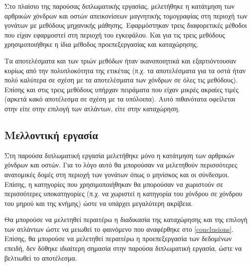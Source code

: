 \documentclass[a4paper,12pt]{article}
\begin{document}
Στο πλαίσιο της παρούσας διπλωματικής εργασίας, μελετήθηκε η κατάτμηση των
αρθρικών χόνδρων και οστών απεικονίσεων μαγνητικής τομογραφίας στη περιοχή των
γονάτων με μεθόδους μηχανικής μάθησης. Εφαρμόστηκαν τρεις διαφορετικές μέθοδοι
\cite{Zhang:1} \cite{Tong:1} \cite{Coupe:1} που είχαν εφαρμοστεί στη περιοχή του
εγκεφάλου. Και για τις τρεις μεθόδους χρησιμοποιήθηκε η ίδια μέθοδος
προεπεξεργασίας και καταχώρησης.

Τα αποτελέσματα και των τριών μεθόδων ήταν ικανοποιητικά και εξαρτιόντουσαν
κυρίως από την πολυπλοκότητα της ετικέτας (π.χ. τα αποτελέσματα για τα οστά ήταν
πολύ καλύτερα σε σχέση με τα αποτελέσματα των χόνδρων σε όλες τις μεθόδους).
Επίσης και στις τρεις μεθόδους υπήρχαν πειράματα που είχαν μικρές ακραίες τιμές
(αρκετά κακό αποτέλεσμα σε σχέση με τα υπόλοιπα). Αυτό πιθανότατα οφείλεται στην
είτε στην επιλογή των ατλάντων, είτε στην καταχώρηση.

\subsection{Μελλοντική εργασία}

Στη παρούσα διπλωματική εργασία μελετήθηκε μόνο η κατάτμηση των αρθρικών χόνδρων
και οστών. Για το λόγο αυτό θα μπορούσαν να μελετηθούν περισσότερες ανατομικές
δομές στη περιοχή των γονάτων όπως ο μηνίσκος και οι σύνδεσμοι. Επίσης, η
κατηγορίες που χρησιμοποιήθηκαν θα μπορούσαν να χωριστούν σε περισσότερες
υποκατηγορίες (π.χ. να χωριστεί η κατηγορία του χόνδρου σε χόνδρου του μηρού και
της κνήμης) ώστε να υπάρχει μεγαλύτερη ακρίβεια.

Θα μπορούσε να μελετηθεί περαιτέρω η διαδικασία της καταχώρησης και της επιλογή
των ατλάντων ώστε να μειωθεί το φαινόμενο που αναφέρθηκε στο \ref{conclusions}.
Επίσης, θα μπορούσε να μελετηθεί περαιτέρω η προεπεξεργασία των δεδομένων
επειδή, δεν δόθηκε ιδιαίτερη σημασία στην παρούσα διπλωματική εργασία, ώστε να
βελτιωθεί το αποτέλεσμα.

\newpage

\printbibliography[title=Βιβλιογραφία]
\end{document}
